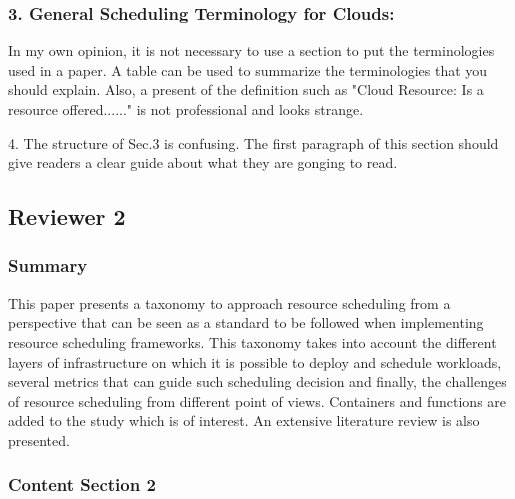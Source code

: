 
\subsubsection{3. General Scheduling Terminology for Clouds:}

In my own opinion, it is not necessary to use a section to put the terminologies used in a paper. A table can be used to summarize the terminologies that you should explain. Also, a present of the definition such as "Cloud Resource: Is a resource offered......" is not professional and looks strange.



4. The structure of Sec.3 is confusing. The first paragraph of this section should give readers a clear guide about what they are gonging to read.



\subsection{Reviewer 2}

\subsubsection{Summary}

This paper presents a taxonomy to approach resource scheduling from a perspective that can be seen as a standard to be followed when implementing resource scheduling frameworks. This taxonomy takes into account the different layers of infrastructure on which it is possible to deploy and schedule workloads, several metrics that can guide such scheduling decision and finally, the challenges of resource scheduling from different point of views. Containers and functions are added to the study which is of interest. An extensive literature review is also presented.


\subsubsection{Content Section 2}


